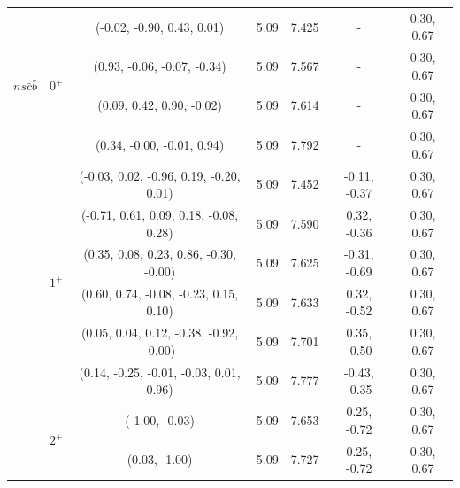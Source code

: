 \documentclass[prd,twocolumn,floatfix,nofootinbib]{revtex4}
\begin{document}
\begin{table}[!htbp]
\begin{tabular}{ccccccc}
        \multirow{4}{*}{$ns\bar{c}\bar{b}$}             
                        &\multirow{4}{*}{$0^{+}$}             
                                    &(-0.02, -0.90, 0.43, 0.01)                 &5.09	    &7.425	    &-              &0.30, 0.67 \\ 
                        &           &(0.93, -0.06, -0.07, -0.34)                &5.09	    &7.567	    &-              &0.30, 0.67 \\ 
                        &           &(0.09, 0.42, 0.90, -0.02)                  &5.09	    &7.614	    &-              &0.30, 0.67 \\ 
                        &           &(0.34, -0.00, -0.01, 0.94)                 &5.09	    &7.792	    &-              &0.30, 0.67 \\ 
                        &\multirow{6}{*}{$1^{+}$}
                                    &(-0.03, 0.02, -0.96, 0.19, -0.20, 0.01)    &5.09	    &7.452	    &-0.11, -0.37   &0.30, 0.67 \\ 
                        &           &(-0.71, 0.61, 0.09, 0.18, -0.08, 0.28)     &5.09	    &7.590	    &0.32, -0.36    &0.30, 0.67 \\ 
                        &           &(0.35, 0.08, 0.23, 0.86, -0.30, -0.00)     &5.09	    &7.625	    &-0.31, -0.69   &0.30, 0.67 \\ 
                        &           &(0.60, 0.74, -0.08, -0.23, 0.15, 0.10)     &5.09	    &7.633	    &0.32, -0.52    &0.30, 0.67 \\ 
                        &           &(0.05, 0.04, 0.12, -0.38, -0.92, -0.00)    &5.09	    &7.701	    &0.35, -0.50    &0.30, 0.67 \\ 
                        &           &(0.14, -0.25, -0.01, -0.03, 0.01, 0.96)    &5.09	    &7.777	    &-0.43, -0.35   &0.30, 0.67 \\ 
                        &\multirow{2}{*}{$2^{+}$}
                                    &(-1.00, -0.03)                             &5.09	    &7.653	    &0.25, -0.72    &0.30, 0.67 \\ 
                        &           &(0.03, -1.00)                              &5.09	    &7.727	    &0.25, -0.72    &0.30, 0.67 \\ 
        \hline\hline
    \end{tabular}
\end{table}
\end{document}
